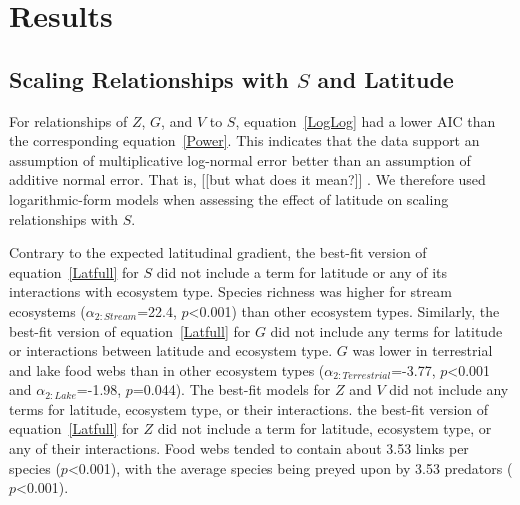 \documentclass[12pt]{article}
\begin{document}




\section*{Results}

\subsection*{Scaling Relationships with $S$ and Latitude}

For relationships of $Z$, $G$, and $V$ to $S$, equation~\ref{LogLog} had a lower AIC than the corresponding
equation~\ref{Power}. This indicates that the data support an assumption of multiplicative log-normal
error better than an assumption of additive normal error. That is, [[but what does it mean?]] . 
We therefore used logarithmic-form models when assessing the effect of latitude on scaling relationships 
with $S$. 


Contrary to the expected latitudinal gradient, the best-fit version of equation~\ref{Latfull} for $S$
did not include a term for latitude or any of its interactions with ecosystem type. Species richness was
higher for stream ecosystems ($\alpha_{2:Stream}$=22.4, $p$\textless0.001) than other ecosystem types. 
Similarly, the best-fit version of equation~\ref{Latfull} for $G$ did not include 
any terms for latitude or interactions between latitude and ecosystem type. $G$ was lower in terrestrial
and lake food webs than in other ecosystem types ($\alpha_{2:Terrestrial}$=-3.77, $p$\textless0.001 and 
$\alpha_{2:Lake}$=-1.98, $p$=0.044). The best-fit models for $Z$ and $V$ did not include any terms for
latitude, ecosystem type, or their interactions.
the best-fit version of equation~\ref{Latfull} for $Z$ did not include a term for latitude,
ecosystem type, or any of their interactions. Food webs tended to contain about 3.53 links per species
($p$\textless0.001), with the average species being preyed upon by 3.53 predators ($p$\textless0.001).
\end{document}
